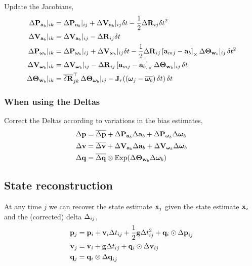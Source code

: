 Update the Jacobians,
%
\begin{align} 
\begin{split}
\DP_{\ab} |_{ik}
&= \DP_{\ab}|_{ij} + \DV_{\ab}|_{ij}\dt -\frac12\DR_{ij}\dt^2 \\
\DV_{\ab}|_{ik} 
&= \DV_{\ab}|_{ij} - \DR_{ij}\dt \\ 
\DP_{\wb} |_{ik}
&= \DP_{\wb}|_{ij} + \DV_{\wb}|_{ij}\dt -\frac12\DR_{ij}\hatx{\bfa_{mj}-\ab}\DTH_{\bfw_b}|_{ij}\,\dt^2 \\
\DV_{\wb}|_{ik} 
&= \DV_{\wb}|_{ij} - \DR_{ij}\hatx{\bfa_{mj}-\ab}\DTH_{\bfw_b}|_{ij}\,\dt \\
\DTH_{\bfw_b}|_{ik} 
&= \ol\dR_{jk}\tr\,\DTH_{\wb}|_{ij} - \bfJ_r((\bw_j-\ol\wb)\,\dt)\,\dt
\end{split}
\end{align}
%




\subsubsection{When using the Deltas}

Correct the Deltas according to variations in the bias estimates,
%
\begin{align}
\begin{split}
\Dp &= \ol\Dp + \DP_{\ab}\D\ab  + \DP_{\wb}\D\wb  \\ 
\Dv &= \ol\Dv + \DV_{\ab}\D\ab  + \DV_{\wb}\D\wb  \\
\Dq &= \ol\Dq\ot\Exp(\DTH_{\bfw_b}\D\wb)
\end{split}
\end{align}

\subsection{State reconstruction}

At any time $j$ we can recover the state estimate $\bfx_j$ given the state estimate $\bfx_i$ and the (corrected) delta $\D_{ij}$,
%
\begin{align} \label{equ:reconstruction}
\begin{split}
\bfp_j &= \bfp_i + \bfv_i\Dt_{ij} + \frac12\bfg\Dt_{ij}^2 + \bfq_i\od\Dp_{ij} \\
\bfv_j &= \bfv_i + \bfg\Dt_{ij} + \bfq_i\od\Dv_{ij} \\
\bfq_j &= \bfq_i\ot\Dq_{ij}   
\end{split}
\end{align}

